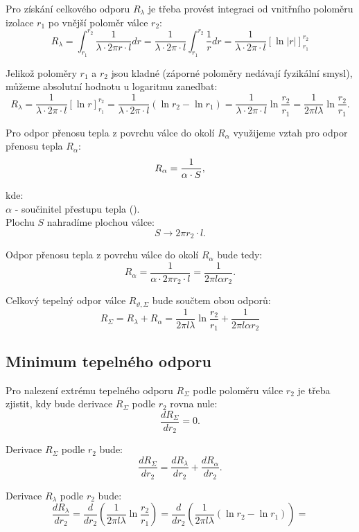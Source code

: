 \documentclass{article}
\begin{document}
Pro získání celkového odporu $R_\lambda$ je třeba provést integraci od vnitřního poloměru izolace $r_1$ po vnější poloměr válce $r_2$:
$$
    R_\lambda = \int_{r_1}^{r_2} \frac{1}{\lambda \cdot 2 \pi r \cdot l} dr = \frac{1}{\lambda \cdot 2 \pi \cdot l} \int_{r_1}^{r_2} \frac{1}{r} dr = \frac{1}{\lambda \cdot 2 \pi \cdot l} \left[ \ln |r| \right]_{r_1}^{r_2}
$$

Jelikož poloměry $r_1$ a $r_2$ jsou kladné (záporné poloměry nedávají fyzikální smysl), můžeme absolutní hodnotu u logaritmu zanedbat:
$$
    R_\lambda = \frac{1}{\lambda \cdot 2 \pi \cdot l} \left[ \ln r \right]_{r_1}^{r_2} = \frac{1}{\lambda \cdot 2 \pi \cdot l} \left( \ln r_2 - \ln r_1 \right) = \frac{1}{\lambda \cdot 2 \pi \cdot l} \ln \frac{r_2}{r_1} = \frac{1}{2 \pi l \lambda} \ln \frac{r_2}{r_1}.
$$

Pro odpor přenosu tepla z povrchu válce do okolí $R_\alpha$ využijeme vztah pro odpor přenosu tepla $R_\alpha$:
\begin{equation}
    R_\alpha = \frac{1}{\alpha \cdot S},
    \unit{(\ueqKandWinv)}
\end{equation}

kde:\\
$\alpha$ - součinitel přestupu tepla (\ueqWandMinvsqKinv).\\

Plochu $S$ nahradíme plochou válce:
$$
    S \rightarrow 2 \pi r_2 \cdot l.
$$

Odpor přenosu tepla z povrchu válce do okolí $R_\alpha$ bude tedy:
$$
    R_\alpha = \frac{1}{\alpha \cdot 2 \pi r_2 \cdot l} = \frac{1}{2 \pi l \alpha r_2}.
$$

Celkový tepelný odpor válce $R_{\vartheta, \Sigma}$ bude součtem obou odporů:
$$
    R_\Sigma = R_\lambda + R_\alpha = \frac{1}{2 \pi l \lambda} \ln \frac{r_2}{r_1} + \frac{1}{2 \pi l \alpha r_2}
$$


\subsection{Minimum tepelného odporu}

Pro nalezení extrému tepelného odporu $R_\Sigma$ podle poloměru válce $r_2$ je třeba zjistit, kdy bude derivace $R_\Sigma$ podle $r_2$ rovna nule:
$$
    \frac{dR_\Sigma}{dr_2} = 0.
$$

Derivace $R_\Sigma$ podle $r_2$ bude:
$$
    \frac{dR_\Sigma}{dr_2} = \frac{dR_\lambda}{dr_2} + \frac{dR_\alpha}{dr_2}.
$$

Derivace $R_\lambda$ podle $r_2$ bude:
$$
    \frac{dR_\lambda}{dr_2} = \frac{d}{dr_2} \left( \frac{1}{2 \pi l \lambda} \ln \frac{r_2}{r_1} \right) = \frac{d}{dr_2} \left( \frac{1}{2 \pi l \lambda} \left(\ln r_2 - \ln r_1 \right) \right) =
$$
\end{document}
